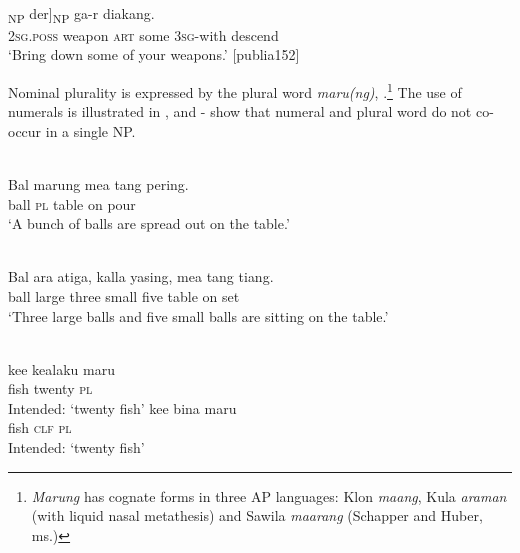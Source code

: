 \ea%
\label{ex:9:14}
 \\
\gll [[{Hai} bloppa sing]\textsubscript{NP} {der}]\textsubscript{NP} ga-r diakang.  \\
  \textsc{2sg.poss} weapon \textsc{art} some 3\textsc{sg-}with descend  \\
\glt `Bring down some of your weapons.' [publia152]
\z






Nominal plurality is expressed by the plural word \textit{maru(ng)}, .\footnote{  \textit{Marung} has cognate forms in three AP languages: Klon \textit{maang}, Kula \textit{araman} (with liquid nasal metathesis) and Sawila \textit{maarang} (Schapper and Huber, ms.)} The use of numerals is illustrated in , and - show that numeral and plural word do not co-occur in a single NP.


\ea%
\label{ex:9:15}
 \\
\gll  Bal  marung mea tang pering. \\
 ball \textsc{pl} table on pour   \\
\glt `A bunch of balls are spread out on the table.'
\z







\ea %
\label{bkm:Ref334530759}
 \\
\gll Bal ara atiga, kalla yasing, mea tang {ti}{{\textglotstop}}{ang.} \\
 ball large three small five table on  set \\
\glt `Three large balls and five small balls are sitting on the table.'
\z



\ea%
\label{ex:9:17}
 \\
\ea
\gll *ke{\textglotstop}e kealaku maru \\
   fish  twenty \textsc{pl} \\
\glt Intended: \textsc{`}twenty fish'
\ex
\gll *ke{\textglotstop}e bina maru \\
 fish \textsc{clf} \textsc{pl} \\
\glt Intended: `twenty fish'
\z
\z


